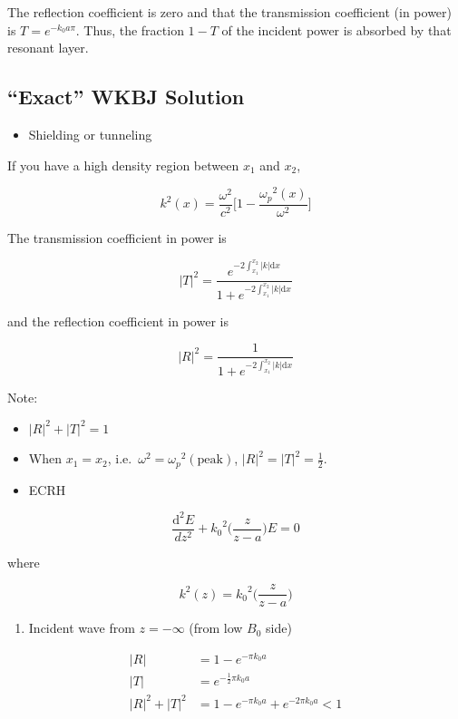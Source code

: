 \documentclass[
  notoc %
]{tufte-book}
\providecommand{\tightlist}{%
  \setlength{\itemsep}{0pt}\setlength{\parskip}{0pt}
}
\begin{document}
The reflection coefficient is zero and that the transmission coefficient
(in power) is \(T=e^{-k_0 a\pi}\). Thus, the fraction \(1-T\) of the
incident power is absorbed by that resonant layer.

\hypertarget{exact-wkbj-solution}{%
\subsection{``Exact'' WKBJ Solution}\label{exact-wkbj-solution}}

\begin{itemize}
\tightlist
\item
  Shielding or tunneling
\end{itemize}

If you have a high density region between \(x_1\) and \(x_2\),

\[
k^2(x) = \frac{\omega^2}{c^2}\big[ 1-\frac{{\omega_p}^2(x)}{\omega^2}\big]
\]

The transmission coefficient in power is

\[
|T|^2 = \frac{e^{-2\int_{x_1}^{x_2}|k|\mathrm{d}x}}{1+e^{-2\int_{x_1}^{x_2}|k|\mathrm{d}x}}
\]

and the reflection coefficient in power is

\[
|R|^2 = \frac{1}{1+e^{-2\int_{x_1}^{x_2}|k|\mathrm{d}x}}
\]

Note:

\begin{itemize}
\item
  \(|R|^2+|T|^2 = 1\)
\item
  When \(x_1=x_2\), i.e.~\(\omega^2 = {\omega_p}^2(\text{peak})\),
  \(|R|^2=|T|^2=\frac{1}{2}\).
\item
  ECRH
\end{itemize}

\[
\frac{\mathrm{d}^2E}{dz^2} + {k_0}^2\Big( \frac{z}{z-a}\Big)E = 0
\]

where

\[
k^2(z) = {k_0}^2\Big( \frac{z}{z-a}\Big)
\]

\begin{enumerate}
\def\labelenumi{(\Roman{enumi})}
\tightlist
\item
  Incident wave from \(z=-\infty\) (from low \(B_0\) side)
\end{enumerate}

\[
\begin{aligned}
|R| &= 1 - e^{-\pi k_0 a} \\
|T| &= e^{-\frac{1}{2}\pi k_0 a} \\
|R|^2 + |T|^2 &= 1-e^{-\pi k_0 a} + e^{-2\pi k_0 a} <1
\end{aligned}
\]
\end{document}
